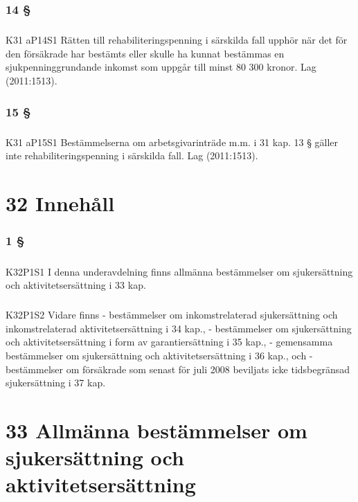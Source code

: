 \documentclass[a4paper,notitlepage,openany,10pt]{book}
\begin{document}
\subsection*{14 §}
\paragraph*{}
{\tiny K31 aP14S1}
Rätten till rehabiliteringspenning i särskilda fall upphör när det för den försäkrade har bestämts eller skulle ha kunnat bestämmas en sjukpenninggrundande inkomst som uppgår till minst 80 300 kronor.
Lag (2011:1513).
\subsection*{15 §}
\paragraph*{}
{\tiny K31 aP15S1}
Bestämmelserna om arbetsgivarinträde m.m. i 31 kap. 13 § gäller inte rehabiliteringspenning i särskilda fall.
Lag (2011:1513).
\chapter*{32 Innehåll}
\subsection*{1 §}
\paragraph*{}
{\tiny K32P1S1}
I denna underavdelning finns allmänna bestämmelser om sjukersättning och aktivitetsersättning i 33 kap.
\paragraph*{}
{\tiny K32P1S2}
Vidare finns
\newline - bestämmelser om inkomstrelaterad sjukersättning och inkomstrelaterad aktivitetsersättning i 34 kap.,
\newline - bestämmelser om sjukersättning och aktivitetsersättning i form av garantiersättning i 35 kap.,
\newline - gemensamma bestämmelser om sjukersättning och aktivitetsersättning i 36 kap., och
\newline - bestämmelser om försäkrade som senast för juli 2008 beviljats icke tidsbegränsad sjukersättning i 37 kap.
\chapter*{33 Allmänna bestämmelser om sjukersättning och aktivitetsersättning}
\end{document}
